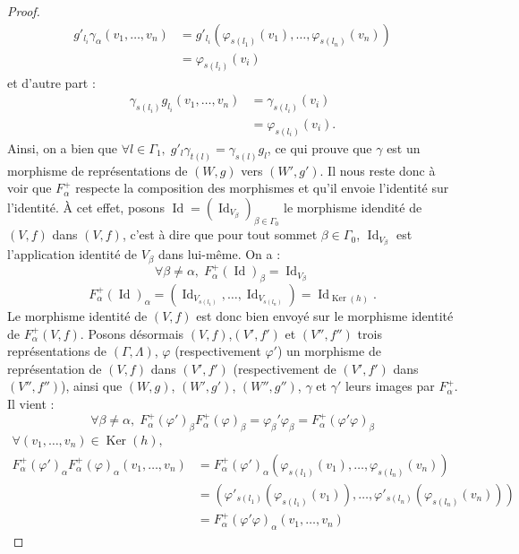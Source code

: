 \documentclass[a4paper,10pt]{article}
\DeclareMathOperator{\Ker}{Ker}
\DeclareMathOperator{\Id}{Id}
\begin{document}
\begin{proof}
\[
\begin{array}{ll}
	g'_{l_{i}}\gamma_{\alpha}(v_{1},\dots,v_{n})&=g'_{l_{i}}(\varphi_{s(l_{1})}(v_{1}),\dots,\varphi_{s(l_{n})}(v_{n}))\\
	&=\varphi_{s(l_{i})}(v_{i})
\end{array}
\]
et d'autre part :
\[
\begin{array}{ll}
	\gamma_{s(l_{i})}g_{l_{i}}(v_{1},\dots,v_{n})&=\gamma_{s(l_{i})}(v_{i})\\
	&=\varphi_{s(l_{i})}(v_{i}).
\end{array}
\]
Ainsi, on a bien que $\forall l \in\Gamma_{1},\;g'_{l}\gamma_{t(l)}=\gamma_{s(l)}g_{l}$, ce qui prouve que $\gamma$ est un morphisme de représentations de $(W,g)$ vers $(W',g')$. Il nous reste donc à voir que $F_{\alpha}^{+}$ respecte la composition des morphismes et qu'il envoie l'identité sur l'identité. À cet effet, posons $\Id = (\Id_{V_{\beta}})_{\beta\in\Gamma_{0}}$ le morphisme idendité de $(V,f)$ dans $(V,f)$, c'est à dire que pour tout sommet $\beta\in\Gamma_{0}$, $\Id_{V_{\beta}}$ est l'application identité de $V_{\beta}$ dans lui-même. On a :
\[
	\forall \beta\neq\alpha,\;F_{\alpha}^{+}(\Id)_{\beta}=\Id_{V_{\beta}}
\]
\[
	F_{\alpha}^{+}(\Id)_{\alpha}=(\Id_{V_{s(l_{1})}},\dots,\Id_{V_{s(l_{n})}})=\Id_{\Ker(h)}.
\]
Le morphisme identité de $(V,f)$ est donc bien envoyé sur le morphisme identité de $F_{\alpha}^{+}(V,f)$. Posons désormais $(V,f)$,$(V',f')$ et $(V'',f'')$ trois représentations de $(\Gamma,\Lambda)$, $\varphi$ (respectivement $\varphi '$) un morphisme de représentation de $(V,f)$ dans $(V',f')$ (respectivement de $(V',f')$ dans $(V'',f'')$), ainsi que $(W,g)$, $(W',g')$, $(W'',g'')$, 
 $\gamma$ et $\gamma '$ leurs images par $F_{\alpha}^{+}$. Il vient :
\[
	\forall \beta\neq\alpha,\;F_{\alpha}^{+}(\varphi')_{\beta}F_{\alpha}^{+}(\varphi)_{\beta}=\varphi_{\beta}'\varphi_{\beta}=F_{\alpha}^{+}(\varphi'\varphi)_{\beta}
\]
\[
	\begin{array}{ll}
		\forall (v_{1},\dots,v_{n})\in\Ker(h),& \\
		F_{\alpha}^{+}(\varphi')_{\alpha}F_{\alpha}^{+}(\varphi)_{\alpha}(v_{1},\dots,v_{n})&=F_{\alpha}^{+}(\varphi')_{\alpha}(\varphi_{s(l_{1})}(v_{1}),\dots,\varphi_{s(l_{n})}(v_{n}))\\
		&=(\varphi'_{s(l_{1})}(\varphi_{s(l_{1})}(v_{1})),\dots,\varphi'_{s(l_{n})}(\varphi_{s(l_{n})}(v_{n})))\\
		&=F_{\alpha}^{+}(\varphi'\varphi)_{\alpha}(v_{1},\dots,v_{n})


\end{array}\]
\end{proof}
\end{document}
